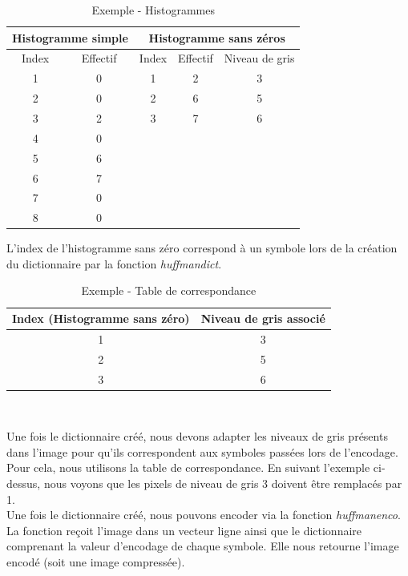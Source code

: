 \documentclass[a4paper, 12pt]{article}
\begin{document}
\begin{table}[!h]
	\centering
		\begin{tabular}{|c c|c c c|}
			\hline 
			\multicolumn{2}{|c|}{Histogramme simple} & \multicolumn{3}{|c|}{ Histogramme sans zéros } \\
			\hline Index & Effectif & Index & Effectif & Niveau de gris\\
			\hline
						1 & 0 & 1  & 2 & 3 \\
						2 & 0 & 2  & 6 & 5\\
						3 & 2 & 3  & 7 & 6\\
						4 & 0 &  & &  \\
						5 & 6 &  & &  \\
						6 & 7 &  & &  \\
						7 & 0 &  & & 	\\
						8 & 0 &  & & 	\\
			\hline
		\end{tabular}
	\caption{Exemple - Histogrammes}
	\label{tab:Histogrammes}
\end{table}

L'index de l'histogramme sans zéro correspond à un symbole lors de la création du dictionnaire par la fonction \textit{huffmandict}. \\

\begin{table}[!h]
	\centering
		\begin{tabular}{|c|c|}
			\hline 
				Index (Histogramme sans zéro) & Niveau de gris associé \\
			\hline 
				1 & 3 \\
				2 & 5 \\
				3 & 6 \\
			\hline
		\end{tabular} \\
	\caption{Exemple - Table de correspondance}
	\label{tab:TableDeCorrespondance}
\end{table}

Une fois le dictionnaire créé, nous devons adapter les niveaux de gris présents dans l'image pour qu'ils correspondent aux symboles passées lors de l'encodage. Pour cela, nous utilisons la table de correspondance. En suivant l'exemple ci-dessus, nous voyons que les pixels de niveau de gris 3 doivent être remplacés par 1. \\

Une fois le dictionnaire créé, nous pouvons encoder via la fonction \textit{huffmanenco}. La fonction reçoit l'image dans un vecteur ligne ainsi que le dictionnaire comprenant la valeur d'encodage de chaque symbole. Elle nous retourne l'image encodé (soit une image compressée). \\
\end{document}
